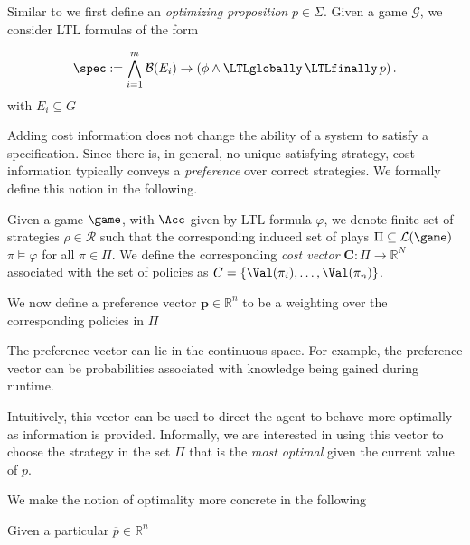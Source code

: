 \begin{definition}
Similar to \cite{smith2011optimal} we first define an \emph{optimizing proposition} $p \in \Sigma$. Given a game $\mathcal G$, we consider LTL formulas of the form

\begin{equation}
\label{eq:temp_spec}
\spec:=\bigwedge_{i=1}^{m} \mathcal{B}(E_{i}) \rightarrow \left(\phi \wedge \LTLglobally\,\LTLfinally\, p\right).
\end{equation}
with $E_i \subseteq G$

\end{definition}

Adding cost information does not change the ability of a system to satisfy a specification. Since there is, in general, no unique satisfying strategy, cost information typically conveys a \emph{preference} over correct strategies. We formally define this notion in the following. 
\begin{definition}
Given a game $\game$, with $\Acc$ given by LTL formula $\varphi$, we denote finite set of strategies $\rho \in \mathcal{R}$ such that the corresponding induced set of plays $\Pi \subseteq \mathcal{L}(\game)$  $\pi \models \varphi$ for all $\pi \in \Pi$. We define the corresponding \emph{cost vector} $\mathbf{C}:\Pi \rightarrow \mathbb{R}^N$ associated with the set of policies as $C = \{\Val(\pi_i),\ldots,\Val(\pi_n)\}$. 

We now define a preference vector $\mathbf{p} \in \mathbb{R}^n$ to be a weighting over the corresponding policies in $\Pi$

 
\end{definition}

The preference vector can lie in the continuous space. For example, the preference vector can be probabilities associated with knowledge being gained during runtime. 

Intuitively, this vector can be used to direct the agent to behave more optimally as information is provided. Informally, we are interested in using this vector to choose the strategy in the set $\Pi$ that is the \emph{most optimal} given the current value of $p$. 

We make the notion of optimality more concrete in the following

\begin{definition}
Given a particular $\overline{p} \in \mathbb{R}^n$
\end{definition}

